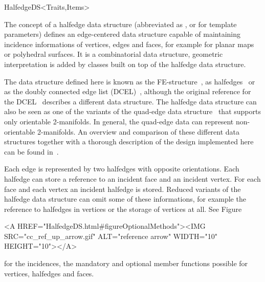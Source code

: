 
\ccRefPageBegin



\begin{ccRefConcept}{HalfedgeDS<Traits,Items>}

\ccTagFullDeclarations

\ccDefinition
  
The concept of a halfedge data structure (abbreviated as \ccRefName, or
 for template parameters) defines an edge-centered data structure
capable of maintaining incidence informations of vertices, edges and
faces, for example for planar maps or polyhedral surfaces. It is a
combinatorial data structure, geometric interpretation is added by
classes built on top of the halfedge data structure.

The data structure defined here is known as the
FE-structure~\cite{w-ebdss-85}, as
halfedges~\cite{m-ism-88,bfh-mgedm-95} or as the doubly connected edge
list (DCEL)~\cite{bkos-cgaa-97}, although the original reference for
the DCEL~\cite{mp-fitcp-78} describes a different data structure. The
halfedge data structure can also be seen as one of the variants of the
quad-edge data structure~\cite{gs-pmgsc-85} that supports only
orientable 2-manifolds. In general, the quad-edge data can represent
non-orientable 2-manifolds.  An overview and comparison of these
different data structures together with a thorough description of the
design implemented here can be found in~\cite{k-ugpdd-99}.

Each edge is represented by two halfedges with opposite orientations.
Each halfedge can store a reference to an incident face and an
incident vertex.  For each face and each vertex an incident halfedge
is stored.  Reduced variants of the halfedge data structure can omit
some of these informations, for example the reference to halfedges in
vertices or the storage of vertices at all. See 
Figure~\ccTexHtml{\ref{figureOptionalMethods}}{}\begin{ccHtmlOnly}
  <A HREF="HalfedgeDS.html#figureOptionalMethods"><IMG 
  SRC="cc_ref_up_arrow.gif" ALT="reference arrow" WIDTH="10" HEIGHT="10"></A>
\end{ccHtmlOnly}
for the incidences, the mandatory and optional member functions
possible for vertices, halfedges and faces.


\end{ccRefConcept}

